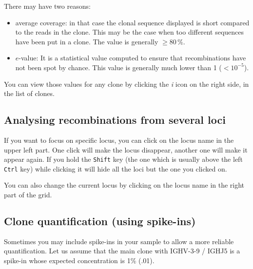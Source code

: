 \documentclass[10pt]{article}
\begin{document}
There may have two reasons: 
\begin{itemize}
\item average coverage: in that case the clonal sequence displayed is short
  compared to the reads in the clone. This may be the case when too different
  sequences have been put in a clone. The value is generally $\geq 80\,\%$.
\item $e$-value: It is a statistical value computed to ensure that
  recombinations have not been spot by chance. This value is generally much
  lower than 1 ($<10^{-5}$).
\end{itemize}

You can view those values for any clone by clicking the \textit{i} icon on the
right side, in the list of clones.
\subsection{Analysing recombinations from several loci}

If you want to focus on specific locus, you can click on the locus name in
the upper left part. One click will make the locus disappear, another one will
make it appear again.
If you hold the \texttt{Shift} key (the one which is usually above the left
\texttt{Ctrl} key) while clicking it will hide all the loci but the one you
clicked on.




You can also change the current locus by clicking on the locus name in the
right part of the grid.


\subsection{Clone quantification (using spike-ins)}

Sometimes you may include spike-ins in your sample to allow a more reliable
quantification.
Let us assume that the main clone with IGHV-3-9 / IGHJ5 is a spike-in whose
expected concentration is 1\% (.01).

\end{document}
